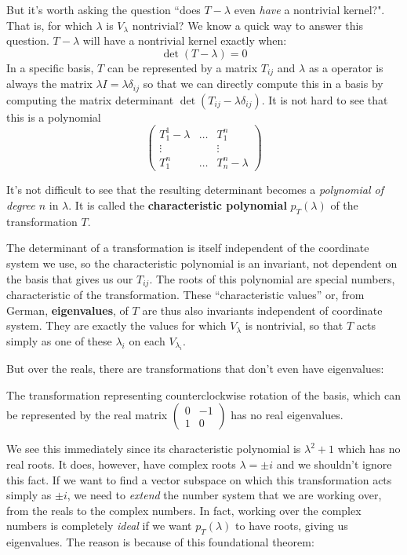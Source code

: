 \begin{appendices}
	But it's worth asking the question ``does $T-\lambda$ even \emph{have} a nontrivial kernel?". That is, for which $\lambda$ is $V_\lambda$ nontrivial? We know a quick way to answer this question. $T - \lambda$ will have a nontrivial kernel exactly when:
	\begin{equation}
		\det ( T - \lambda ) = 0
	\end{equation}
	In a specific basis, $T$ can be represented by a matrix $T_{ij}$ and $\lambda$ as a operator is always the matrix $\lambda I = \lambda \delta_{ij}$ so that we can directly compute this in a basis by computing the matrix determinant $\det(T_{ij} - \lambda \delta_{ij})$. It is not hard to see that this is a polynomial 
	\begin{equation}
		\begin{pmatrix}
			T_{1}^1 - \lambda & \dots & T_{1}^n\\
			\vdots &	   & \vdots\\
			T_{1}^n & \dots & T_{n}^n - \lambda 
		\end{pmatrix}
	\end{equation}
	
	 It's not difficult to see that the resulting determinant becomes a \emph{polynomial of degree $n$} in $\lambda$. It is called the \textbf{characteristic polynomial} $p_T(\lambda)$ of the transformation $T$.
	 
	 The determinant of a transformation is itself independent of the coordinate system we use, so the characteristic polynomial is an invariant, not dependent on the basis that gives us our $T_{ij}$. The roots of this polynomial are special numbers, characteristic of the transformation. These ``characteristic values'' or, from German, \textbf{eigenvalues}, of $T$ are thus also invariants independent of coordinate system. They are exactly the values for which $V_\lambda$ is nontrivial, so that $T$ acts simply as one of these $\lambda_i$ on each $V_{\lambda_i}$. 
	 
	 But over the reals, there are transformations that don't even have eigenvalues:
	 \begin{example}
	 	The transformation representing counterclockwise rotation of the basis, which can be represented by the real matrix $\begin{pmatrix}
	 		0 & -1 \\ 1 & 0
	 	\end{pmatrix}$
		has no real eigenvalues.
	 \end{example}
	 We see this immediately since its characteristic polynomial is $\lambda^2 + 1$ which has no real roots. It does, however, have complex roots $\lambda = \pm i$ and we shouldn't ignore this fact. If we want to find a vector subspace on which this transformation acts simply as $\pm i$, we need to \emph{extend} the number system that we are working over, from the reals to the complex numbers. In fact, working over the complex numbers is completely \emph{ideal} if we want $p_T(\lambda)$ to have roots, giving us eigenvalues. The reason is because of this foundational theorem:
	 

\end{appendices}
